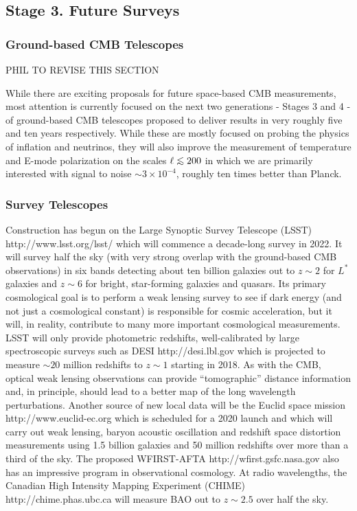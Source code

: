 \documentclass[psfig,11pt]{article}
\def\lo{\mathrel{\raise.3ex\hbox{$<$}\mkern-14mu\lower0.6ex\hbox{$\sim$}}}
\begin{document}
\subsection{Stage 3. Future Surveys}

\subsubsection{Ground-based CMB Telescopes}

PHIL TO REVISE THIS SECTION

While there are exciting proposals for future space-based CMB measurements, most attention is currently focused on the next two generations - Stages 3 and 4 - of ground-based CMB telescopes proposed to deliver results in very roughly five and ten years respectively. While these are mostly focused on probing the physics of inflation and neutrinos, they will also improve the measurement of temperature and E-mode polarization on the scales $\ell\lo200$ in which we are primarily interested with signal to noise $\sim3\times10^{-4}$, roughly ten times better than Planck.

\subsubsection{Survey Telescopes}

Construction has begun on the Large Synoptic Survey Telescope (LSST) http://www.lsst.org/lsst/ which will commence a decade-long survey in 2022. It will survey half the sky (with very strong overlap with the ground-based CMB observations) in six bands detecting about ten billion galaxies out to $z\sim2$ for $L^\ast$ galaxies and $z\sim6$ for bright, star-forming galaxies and quasars. Its primary cosmological goal is to perform a weak lensing survey to see if dark energy (and not just a cosmological constant) is responsible for cosmic acceleration, but it will, in reality, contribute to many more important cosmological measurements. LSST will only provide photometric redshifts, well-calibrated by large spectroscopic surveys such as DESI http://desi.lbl.gov which is projected to measure $\sim20$ million redshifts to $z\sim1$ starting in 2018. As with the CMB, optical weak lensing observations can provide ``tomographic'' distance information and, in principle, should lead to a better map of the long wavelength perturbations. Another source of new local data will be the Euclid space mission http://www.euclid-ec.org which is scheduled for a 2020 launch and which will carry out weak lensing, baryon acoustic oscillation and redshift space distortion measurements using 1.5 billion galaxies and 50 million redshifts over more than a third of the sky. The proposed WFIRST-AFTA http://wfirst.gsfc.nasa.gov also has an impressive program in observational cosmology. At radio wavelengths, the Canadian High Intensity Mapping Experiment (CHIME) http://chime.phas.ubc.ca will measure BAO out to $z\sim2.5$ over half the sky.
\end{document}

